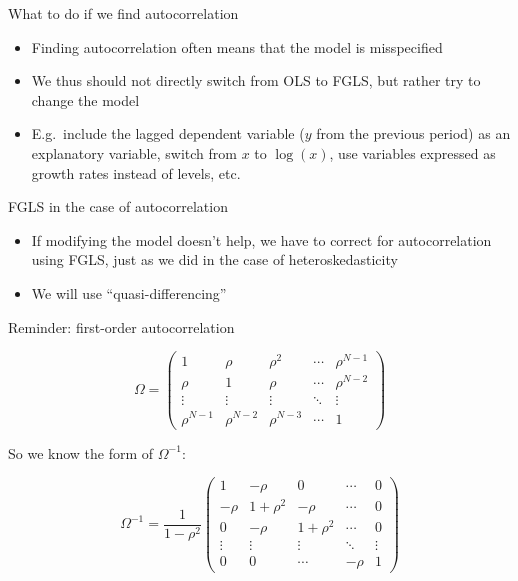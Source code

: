 \documentclass[aspectratio=169]{beamer}
\begin{document}
\begin{frame}{What to do if we find autocorrelation}

\begin{itemize}
    \item Finding autocorrelation often means that the model is misspecified
    \item We thus should not directly switch from OLS to FGLS, but rather try to change the model
    \item E.g.\ include the lagged dependent variable ($y$ from the previous period) as an explanatory variable, switch from $x$ to $\log(x)$, use variables expressed as growth rates instead of levels, etc.
\end{itemize}

\end{frame}

\begin{frame}{FGLS in the case of autocorrelation}

\begin{itemize}
    \item If modifying the model doesn't help, we have to correct for autocorrelation using FGLS, just as we did in the case of heteroskedasticity
    \item We will use ``quasi-differencing''
\end{itemize}

\end{frame}

\begin{frame}{Reminder: first-order autocorrelation}

\[
\Omega = \begin{pmatrix}
1 & \rho & \rho^2 & \cdots & \rho^{N-1}\\
\rho & 1 & \rho & \cdots & \rho^{N-2}\\
\vdots & \vdots & \vdots & \ddots & \vdots\\
\rho^{N-1} & \rho^{N-2} & \rho^{N-3} & \cdots & 1
\end{pmatrix}
\]

So we know the form of $\Omega^{-1}$:

\[
\Omega^{-1} = \frac{1}{1-\rho^2}\begin{pmatrix}
1 & -\rho & 0 & \cdots & 0\\
-\rho & 1+\rho^2 & -\rho & \cdots & 0\\
0 & -\rho & 1+\rho^2 & \cdots & 0\\
\vdots & \vdots & \vdots & \ddots & \vdots\\
0 & 0 & \cdots & -\rho & 1
\end{pmatrix}
\]

\end{frame}
\end{document}

